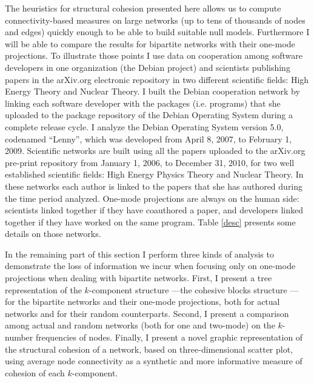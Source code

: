 The heuristics for structural cohesion presented here allows us to compute connectivity-based measures on large networks (up to tens of thousands of nodes and edges) quickly enough to be able to build suitable null models. Furthermore I will be able to compare the results for bipartite networks with their one-mode projections. To illustrate those points I use data on cooperation among software developers in one organization (the Debian project) and scientists publishing papers in the arXiv.org electronic repository in two different scientific fields: High Energy Theory and Nuclear Theory. I built the Debian cooperation network by linking each software developer with the packages (i.e. programs) that she uploaded to the package repository of the Debian Operating System during a complete release cycle. I analyze the Debian Operating System version 5.0, codenamed ``Lenny'', which was developed from April 8, 2007, to February 1, 2009. Scientific networks are built using all the papers uploaded to the arXiv.org pre-print repository from January 1, 2006, to December 31, 2010, for two well established scientific fields: High Energy Physics Theory and Nuclear Theory. In these networks each author is linked to the papers that she has authored during the time period analyzed. One-mode projections are always on the human side: scientists linked together if they have coauthored a paper, and developers linked together if they have worked on the same program. Table \ref{desc} presents some details on those networks.

In the remaining part of this section I perform three kinds of analysis to demonstrate the loss of information we incur when focusing only on one-mode projections when dealing with bipartite networks. First, I present a tree representation of the $k$-component structure ---the cohesive blocks structure \citep{white:2001,moody:2003,white:2004,mani:2014}--- for the bipartite networks and their one-mode projections, both for actual networks and for their random counterparts. Second, I present a comparison among actual and random networks (both for one and two-mode) on the $k$-number frequencies of nodes. Finally, I present a novel graphic representation of the structural cohesion of a network, based on three-dimensional scatter plot, using average node connectivity as a synthetic and more informative measure of cohesion of each $k$-component.

